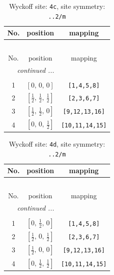 \documentclass[fleqn,8pt]{jsarticle}
\begin{document}
\renewcommand{\arraystretch}{1.2}
\begin{longtable}{ccc}
\caption{Wyckoff site: {\tt 4c}, site symmetry: {\tt ..2/m}}
 \\
 \hline \hline
No. & position & mapping \\ \hline \endfirsthead

\multicolumn{2}{l}{\tablename\ \thetable{}} \\
 \hline \hline
No. & position & mapping \\ \hline \endhead

 \hline \hline
\multicolumn{2}{r}{\footnotesize\it continued ...} \\ \endfoot

 \hline \hline
\multicolumn{2}{r}{} \\ \endlastfoot

1 & $\left[ 0,\, 0,\, 0 \right]$ & {\tt [1,4,5,8]} \\ \hline
2 & $\left[ \frac{1}{2},\, \frac{1}{2},\, \frac{1}{2} \right]$ & {\tt [2,3,6,7]} \\ \hline
3 & $\left[ \frac{1}{2},\, \frac{1}{2},\, 0 \right]$ & {\tt [9,12,13,16]} \\ \hline
4 & $\left[ 0,\, 0,\, \frac{1}{2} \right]$ & {\tt [10,11,14,15]} \\
\end{longtable}
\renewcommand{\arraystretch}{1.2}
\begin{longtable}{ccc}
\caption{Wyckoff site: {\tt 4d}, site symmetry: {\tt ..2/m}}
 \\
 \hline \hline
No. & position & mapping \\ \hline \endfirsthead

\multicolumn{2}{l}{\tablename\ \thetable{}} \\
 \hline \hline
No. & position & mapping \\ \hline \endhead

 \hline \hline
\multicolumn{2}{r}{\footnotesize\it continued ...} \\ \endfoot

 \hline \hline
\multicolumn{2}{r}{} \\ \endlastfoot

1 & $\left[ 0,\, \frac{1}{2},\, 0 \right]$ & {\tt [1,4,5,8]} \\ \hline
2 & $\left[ \frac{1}{2},\, 0,\, \frac{1}{2} \right]$ & {\tt [2,3,6,7]} \\ \hline
3 & $\left[ \frac{1}{2},\, 0,\, 0 \right]$ & {\tt [9,12,13,16]} \\ \hline
4 & $\left[ 0,\, \frac{1}{2},\, \frac{1}{2} \right]$ & {\tt [10,11,14,15]} \\
\end{longtable}
\end{document}
